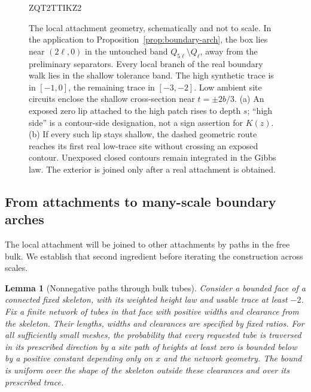 \documentclass[11pt]{article}
\newtheorem{lemma}[theorem]{Lemma}
\theoremstyle{definition}
\theoremstyle{remark}
\numberwithin{equation}{section}
\begin{document}
\begin{figure}[!htbp]
 
 ZQT2TTIKZ2

 \caption{The local attachment geometry, schematically and not to
 scale.  In the application to Proposition~\ref{prop:boundary-arch},
 the box lies near $(2\ell,0)$ in the untouched band
 $Q_{5\ell}\setminus Q_\ell$, away from the preliminary separators.
 Every local branch of the real boundary walk lies in the shallow
 tolerance band.  The high synthetic trace is in $[-1,0]$, the
 remaining trace in $[-3,-2]$.  Low ambient site circuits enclose the
 shallow cross-section near $t=\pm2b/3$.
 (a) An exposed zero lip attached to the high patch rises to depth
 $s$; ``high side'' is a contour-side designation, not a sign
 assertion for $K(z)$.
 (b) If every such lip stays shallow, the dashed geometric route
 reaches its first real low-trace site without crossing an exposed
 contour.  Unexposed closed contours remain integrated in the Gibbs
 law.  The exterior is joined only after a real attachment is obtained.}
 \label{fig:boundary-attachment}
\end{figure}
\FloatBarrier

\subsection{From attachments to many-scale boundary arches}

The local attachment will be joined to other attachments by paths in
the free bulk.  We establish that second ingredient before iterating
the construction across scales.

\begin{lemma}[Nonnegative paths through bulk tubes]
\label{boundary:bulk-tubes}
Consider a bounded face of a connected fixed skeleton, with its weighted
height law and usable trace at least $-2$.  Fix a finite network of
tubes in that face with positive widths and clearance from the skeleton.
Their lengths, widths and clearances are specified by fixed ratios.
For all sufficiently small meshes, the probability that every requested
tube is traversed in its prescribed direction by a site path of heights
at least zero is bounded below by a positive constant depending only
on $x$ and the network geometry.  The bound is uniform over the shape
of the skeleton outside these clearances and over its prescribed trace.
\end{lemma}
\end{document}
